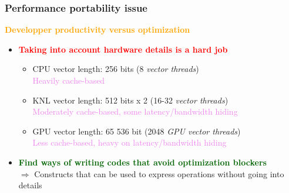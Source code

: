 \begin{frame}
  \frametitle{Performance portability issue}
  \textcolor{orange}{\large \textbf{Developper productivity versus optimization}}

  \begin{itemize}
  \item \textcolor{red}{\bf Taking into account hardware details is a hard job}
    \begin{itemize}
    \item CPU vector length: 256 bits (8 \textit{vector threads})\\
      \textcolor{violet}{Heavily cache-based}
    \item KNL vector length: 512 bits  x  2 (16-32 \textit{vector threads})\\
      \textcolor{violet}{Moderately cache-based, some latency/bandwidth hiding}
    \item GPU vector length: 65 536 bit (2048 \textit{GPU vector threads})\\
      \textcolor{violet}{Less cache-based, heavy on latency/bandwidth hiding}
    \end{itemize}
  \item \textcolor{darkgreen}{\bf Find ways of writing codes that avoid optimization blockers}\\
    $\Rightarrow$ Constructs that can be used to express operations without going into details
  \end{itemize}
\end{frame}

